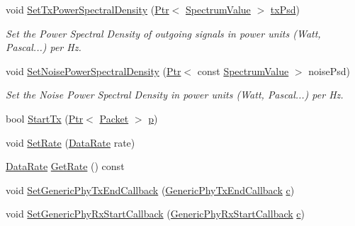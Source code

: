 \begin{DoxyCompactItemize}
\item 
void \hyperlink{classns3_1_1HalfDuplexIdealPhy_ae1502bc7c5a66115a83ca17bb9aa9877}{Set\+Tx\+Power\+Spectral\+Density} (\hyperlink{classns3_1_1Ptr}{Ptr}$<$ \hyperlink{classns3_1_1SpectrumValue}{Spectrum\+Value} $>$ \hyperlink{lte__link__budget__x2__handover__measures_8m_a684fe3101a5e48a5fcc57cab8dbcd1aa}{tx\+Psd})
\begin{DoxyCompactList}\small\item\em Set the Power Spectral Density of outgoing signals in power units (Watt, Pascal...) per Hz. \end{DoxyCompactList}\item 
void \hyperlink{classns3_1_1HalfDuplexIdealPhy_aa2ba1b6b6a64ee31421490d6815290ec}{Set\+Noise\+Power\+Spectral\+Density} (\hyperlink{classns3_1_1Ptr}{Ptr}$<$ const \hyperlink{classns3_1_1SpectrumValue}{Spectrum\+Value} $>$ noise\+Psd)
\begin{DoxyCompactList}\small\item\em Set the Noise Power Spectral Density in power units (Watt, Pascal...) per Hz. \end{DoxyCompactList}\item 
bool \hyperlink{classns3_1_1HalfDuplexIdealPhy_ae5cc5d9c4faab8c4119c7f9a5a631cca}{Start\+Tx} (\hyperlink{classns3_1_1Ptr}{Ptr}$<$ \hyperlink{classns3_1_1Packet}{Packet} $>$ \hyperlink{lte__link__budget__x2__handover__measures_8m_ac9de518908a968428863f829398a4e62}{p})
\item 
void \hyperlink{classns3_1_1HalfDuplexIdealPhy_a24f7594f5b76f4f426aa52268bbc3363}{Set\+Rate} (\hyperlink{classns3_1_1DataRate}{Data\+Rate} rate)
\item 
\hyperlink{classns3_1_1DataRate}{Data\+Rate} \hyperlink{classns3_1_1HalfDuplexIdealPhy_a65a835e89eb30731106f4aa506057649}{Get\+Rate} () const 
\item 
void \hyperlink{classns3_1_1HalfDuplexIdealPhy_a0cdea1b906e1fea994e1802b9d1ab3a5}{Set\+Generic\+Phy\+Tx\+End\+Callback} (\hyperlink{namespacens3_abe7bae5316e52e374e3cdcdaffe585fa}{Generic\+Phy\+Tx\+End\+Callback} \hyperlink{mmwave_2model_2fading-traces_2fading__trace__generator_8m_ae0323a9039add2978bf5b49550572c7c}{c})
\item 
void \hyperlink{classns3_1_1HalfDuplexIdealPhy_af5690b4f6ab77967103c871cd69d36bd}{Set\+Generic\+Phy\+Rx\+Start\+Callback} (\hyperlink{namespacens3_a1c385b3f90e0583c1debfc4a2721cdcf}{Generic\+Phy\+Rx\+Start\+Callback} \hyperlink{mmwave_2model_2fading-traces_2fading__trace__generator_8m_ae0323a9039add2978bf5b49550572c7c}{c})

\end{DoxyCompactItemize}
